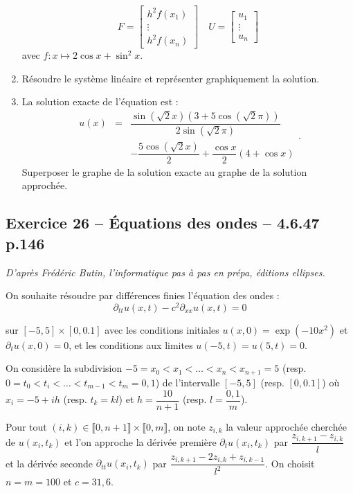 \documentclass[10pt,fleqn]{article} %
\begin{document}
\begin{multicols}{2}
\begin{enumerate}
$$
F=
\begin{bmatrix}
h^2 f(x_1) \\
\vdots \\
h^2 f(x_n)
\end{bmatrix}
\quad
U=
\begin{bmatrix}
u_1 \\
\vdots \\
u_n
\end{bmatrix}
$$
avec $f:x\mapsto 2 \cos x + \sin^2 x$.
\item Résoudre le système linéaire et représenter graphiquement la solution. 
\item La solution exacte de l'équation est :
$$
\begin{array}{lcl}
u(x)&=&\dfrac{\sin \left(\sqrt{2} x\right)  \left( 3+5 \cos \left(\sqrt 2 \pi \right)\right)}{2\sin \left(\sqrt{2} \pi\right)} \\
&&- \dfrac{5\cos \left(\sqrt{2} x\right)}{2}
+ \dfrac{\cos x}{2} \left( 4+\cos x\right)
\end{array}.
$$
Superposer le graphe de la solution exacte au graphe de la solution approchée.
\end{enumerate}


\subsection*{Exercice 26 -- Équations des ondes -- 4.6.47 p.146}
\begin{flushright}
\textit{D'après Frédéric Butin, l'informatique pas à pas en prépa, éditions ellipses.}
\end{flushright}
On souhaite résoudre par différences finies l'équation des ondes : 
$$
\partial_{tt} u(x,t) - c^2 \partial_{xx} u(x,t) = 0
$$

sur $[-5,5] \times [0,0.1]$ avec les conditions initiales $u(x,0)=\exp\left( {-10 x^2}\right)$ et 
$\partial_t u(x,0)=0$, et les conditions aux limites $u(-5,t)=u(5,t)=0$. 

On considère la subdivision $-5=x_0<x_1<\ldots <x_n <  x_{n+1} =5$ (resp. 
$0=t_0<t_i<\ldots<t_{m-1}<t_m=0,1$) de l'intervalle $[-5,5]$ (resp. $[0,0.1]$) où 
$x_i=-5+ih$ (resp. $t_k=kl$) et $h=\dfrac{10}{n+1}$ (resp. $l=\dfrac{0,1}{m}$).

Pour tout $(i,k) \in \llbracket 0,n+1 \rrbracket \times\llbracket 0,m \rrbracket $, on note $z_{i,k}$ la valeur approchée cherchée de $u\left(x_i,t_k\right)$ et l'on approche la dérivée première 
$\partial_{t} u(x_i,t_k)$ par $\dfrac{z_{i,k+1}-z_{i,k}}{l}$ et la dérivée seconde $\partial_{tt} u(x_i,t_k)$ par $\dfrac{z_{i,k+1}-2z_{i,k}+z_{i,k-1}}{l^2}$. On choisit $n=m=100$ et $c=31,6$.


\end{multicols}
\end{document}
